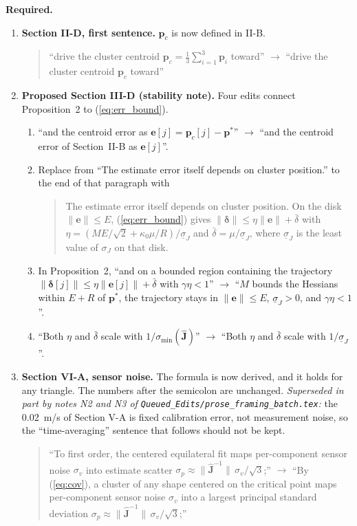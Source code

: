 \documentclass[10pt]{article}
\begin{document}
\noindent\textbf{Required.}
\begin{enumerate}
\item \textbf{Section II-D, first sentence.} $\mathbf{p}_c$ is now defined in II-B.
\begin{quote}
``drive the cluster centroid $\mathbf{p}_c = \frac{1}{3}\sum_{i=1}^{3}\mathbf{p}_i$ toward'' $\to$ ``drive the cluster centroid $\mathbf{p}_c$ toward''
\end{quote}

\item \textbf{Proposed Section III-D (stability note).} Four edits connect Proposition~2 to (\ref{eq:err_bound}).
\begin{enumerate}
\item ``and the centroid error as $\mathbf{e}[j] = \mathbf{p}_c[j] - \mathbf{p}^*$'' $\to$ ``and the centroid error of Section~II-B as $\mathbf{e}[j]$''.
\item Replace from ``The estimate error itself depends on cluster position.'' to the end of that paragraph with
\begin{quote}
The estimate error itself depends on cluster position. On the disk $\|\mathbf{e}\| \le E$, (\ref{eq:err_bound}) gives $\|\boldsymbol{\delta}\| \le \eta\|\mathbf{e}\| + \bar{\delta}$ with $\eta = (ME/\sqrt{2} + \kappa_0\mu/R)/\underline{\sigma}_J$ and $\bar{\delta} = \mu/\underline{\sigma}_J$, where $\underline{\sigma}_J$ is the least value of $\sigma_J$ on that disk.
\end{quote}
\item In Proposition~2, ``and on a bounded region containing the trajectory $\|\boldsymbol{\delta}[j]\| \le \eta\|\mathbf{e}[j]\| + \bar{\delta}$ with $\gamma\eta < 1$'' $\to$ ``$M$ bounds the Hessians within $E + R$ of $\mathbf{p}^*$, the trajectory stays in $\|\mathbf{e}\| \le E$, $\underline{\sigma}_J > 0$, and $\gamma\eta < 1$''.
\item ``Both $\eta$ and $\bar{\delta}$ scale with $1/\sigma_{\min}(\hat{\mathbf{J}})$'' $\to$ ``Both $\eta$ and $\bar{\delta}$ scale with $1/\underline{\sigma}_J$''.
\end{enumerate}

\item \textbf{Section VI-A, sensor noise.} The formula is now derived, and it holds for any triangle. The numbers after the semicolon are unchanged. \emph{Superseded in part by notes N2 and N3 of \texttt{Queued\_Edits/prose\_framing\_batch.tex}:} the 0.02~m/s of Section V-A is fixed calibration error, not measurement noise, so the ``time-averaging'' sentence that follows should not be kept.
\begin{quote}
``To first order, the centered equilateral fit maps per-component sensor noise $\sigma_v$ into estimate scatter $\sigma_p \approx \|\hat{\mathbf{J}}^{-1}\|\,\sigma_v/\sqrt{3}$;'' $\to$ ``By (\ref{eq:cov}), a cluster of any shape centered on the critical point maps per-component sensor noise $\sigma_v$ into a largest principal standard deviation $\sigma_p \approx \|\hat{\mathbf{J}}^{-1}\|\,\sigma_v/\sqrt{3}$;''
\end{quote}


\end{enumerate}
\end{document}

